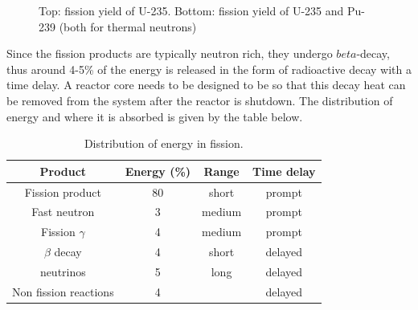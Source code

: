 \begin{figure}[ht!]
\protect {}\protect
\caption{\label{fig:fissyield} \footnotesize{Top: fission yield of U-235. Bottom: fission yield of U-235 and Pu-239 (both for thermal neutrons)}}
\end{figure}

Since the fission products are typically neutron rich, they undergo $beta$-decay, thus around 4-5\% of the energy is released in the form of radioactive decay with a time delay. A reactor core needs to be designed to be so that this decay heat can be removed from the system after the reactor is shutdown. The distribution of energy and where it is absorbed is given by the table below.

\begin{table}\caption{Distribution of energy in fission.}
\begin{tabular}{c | c | c | c}
Product & Energy (\%) & Range & Time delay \\
\hline
Fission product & 80 & short & prompt \\
Fast neutron & 3 & medium & prompt \\
Fission $\gamma$ & 4 & medium & prompt \\
$\beta$ decay & 4 & short & delayed \\
neutrinos & 5 & long & delayed \\
Non fission reactions & 4 &  & delayed 
\end{tabular}
\end{table}

